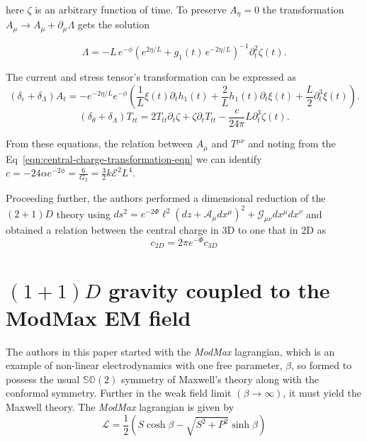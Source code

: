 here $\zeta$ is an arbitrary function of time. To preserve $A_{\eta} = 0$ the transformation $A_{\mu}\to A_{\mu}+\partial_{\mu}\Lambda$ gets the solution 

\begin{equation}
    \Lambda = -L\,e^{-\phi}\left(e^{2\eta/L} + g_1(t)\,e^{-2\eta/L}\right)^{-1}\partial_t^2\zeta(t).
\end{equation}

The current and stress tensor's transformation can be expressed as 
\begin{equation}
    (\delta_{\epsilon} + \delta_{\Lambda}) A_t = -e^{-2\eta/L}e^{-\phi}\left(\frac{1}{L}\xi(t)\partial_th_1(t) + \frac{2}{L}h_1(t)\partial_t\xi(t) + \frac{L}{2}\partial_t^3\xi(t)\right).
\end{equation}
\begin{equation}
    (\delta_{\theta} + \delta_{\Lambda})T_{tt} = 2T_{tt}\partial_t\zeta + \zeta\partial_tT_{tt} - \frac{c}{24\pi}L\partial_t^3\zeta(t).
\end{equation}

From these equations, the relation between $A_{\mu}$ and $T^{\mu\nu}$ and noting from the Eq~\ref{eqn:central-charge-transformation-eqn} we can identify $c=-24\alpha e^{-2\phi}=\displaystyle\frac{6}{G_2}=\displaystyle\frac{3}{2}k\mathcal{E}^2 L^4$.

Proceeding further, the authors performed a dimensional reduction of the $(2+1)D$ theory using $ds^2 = e^{-2\Phi}\ell^2(dz + \mathcal{A}_\mu dx^\mu)^2 + \mathcal{G}_{\mu\nu}dx^\mu dx^\nu$ and obtained a relation between the central charge in 3D to one that in 2D as 
\begin{equation}
    c_{2D} = 2\pi e^{-\Phi}c_{3D}
\end{equation}

\section{$(1+1)D$ gravity coupled to the ModMax EM field \cite{hemant2023}}
\label{drc-hemant-paper}

The authors in this paper started with the \textit{ModMax} lagrangian, which is an example of non-linear electrodynamics with one free parameter, $\beta$, so formed to possess the usual $\mathbb{SO}(2)$ symmetry of Maxwell's theory along with the conformal symmetry. Further in the weak field limit $\left( \beta \to \infty \right) $, it must yield the Maxwell theory. The \textit{ModMax} lagrangian is given by
\begin{equation}
    \label{eqn:modmax-action}
    \mathcal{L} = \frac{1}{2} \left( S \cosh\beta - \sqrt{S^2+P^2}\sinh\beta  \right)
\end{equation}

